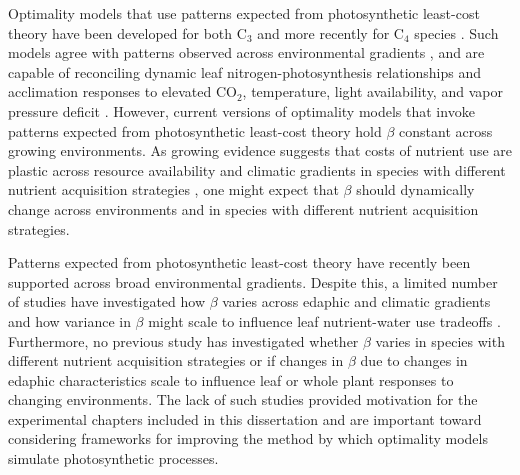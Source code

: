 Optimality models that use patterns expected from photosynthetic least-cost theory have been developed for both C$_3$  and more recently for C$_4$ species . Such models agree with patterns observed across environmental gradients , and are capable of reconciling dynamic leaf nitrogen-photosynthesis relationships and acclimation responses to elevated CO$_2$, temperature, light availability, and vapor pressure deficit . However, current versions of optimality models that invoke patterns expected from photosynthetic least-cost theory hold $\beta$ constant across growing environments. As growing evidence suggests that costs of nutrient use are plastic across resource availability and climatic gradients in species with different nutrient acquisition strategies , one might expect that $\beta$ should dynamically change across environments and in species with different nutrient acquisition strategies.

Patterns expected from photosynthetic least-cost theory have recently been supported across broad environmental gradients. Despite this, a limited number of studies have investigated how $\beta$ varies across edaphic and climatic gradients and how variance in $\beta$ might scale to influence leaf nutrient-water use tradeoffs . Furthermore, no previous study has investigated whether $\beta$ varies in species with different nutrient acquisition strategies or if changes in $\beta$ due to changes in edaphic characteristics scale to influence leaf or whole plant responses to changing environments. The lack of such studies provided motivation for the experimental chapters included in this dissertation and are important toward considering frameworks for improving the method by which optimality models simulate photosynthetic processes.

